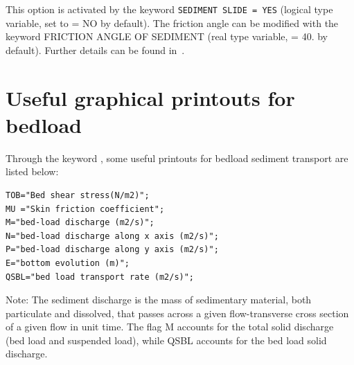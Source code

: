 This option is activated by the keyword \texttt{SEDIMENT SLIDE = YES} (logical type variable, set to {\ttfamily = NO} by default). The friction angle can be modified with the keyword {\ttfamily FRICTION ANGLE OF SEDIMENT} (real type variable, {\ttfamily = 40.} by default). Further details can be found in~\cite{ElKadiAbderrezzak201675}.



\pagebreak

\section{Useful graphical printouts for bedload}
Through the keyword , some useful printouts for bedload sediment transport are listed below:
\begin{lstlisting}[frame=trBL]  
TOB="Bed shear stress(N/m2)";
MU ="Skin friction coefficient";
M="bed-load discharge (m2/s)";
N="bed-load discharge along x axis (m2/s)";
P="bed-load discharge along y axis (m2/s)";
E="bottom evolution (m)";
QSBL="bed load transport rate (m2/s)";
\end{lstlisting}

\begin{WarningBlock}{Note:}
The sediment discharge is the mass of sedimentary material, both particulate and dissolved, that passes across a given flow-transverse cross section of a given flow in unit time. The flag {\ttfamily M} accounts for the total solid discharge (bed load and suspended load), while {\ttfamily QSBL} accounts for the bed load solid discharge.
\end{WarningBlock}

